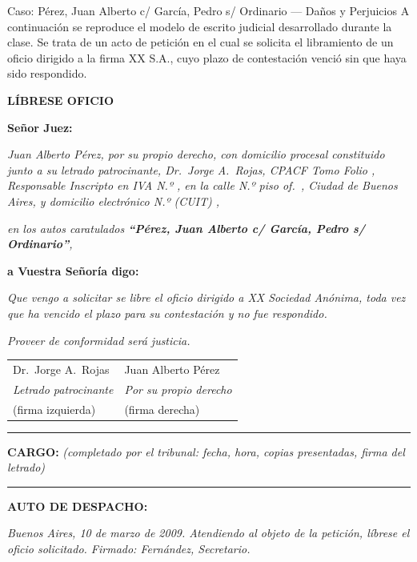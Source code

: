 \documentclass[12pt,oneside]{book}
\begin{document}
\begin{example}{Caso: Pérez, Juan Alberto c/ García, Pedro s/ Ordinario --- Daños y Perjuicios}
A continuación se reproduce el modelo de escrito judicial desarrollado durante la clase. Se trata de un acto de petición en el cual se solicita el libramiento de un oficio dirigido a la firma XX S.A., cuyo plazo de contestación venció sin que haya sido respondido.

\bigskip

\begin{center}
\textbf{LÍBRESE OFICIO}
\end{center}

\medskip

\textbf{Señor Juez:}

\medskip

\textit{Juan Alberto Pérez, por su propio derecho, con domicilio procesal constituido junto a su letrado patrocinante, Dr.\ Jorge A.\ Rojas, CPACF Tomo \underline{\hspace{1cm}} Folio \underline{\hspace{1cm}}, Responsable Inscripto en IVA N.º \underline{\hspace{1.5cm}}, en la calle \underline{\hspace{3cm}} N.º \underline{\hspace{0.8cm}} piso \underline{\hspace{0.5cm}} of.\ \underline{\hspace{0.5cm}}, Ciudad de Buenos Aires, y domicilio electrónico N.º (CUIT) \underline{\hspace{2.5cm}},}

\medskip

\textit{en los autos caratulados \textbf{``Pérez, Juan Alberto c/ García, Pedro s/ Ordinario''},}

\medskip

\textbf{a Vuestra Señoría digo:}

\medskip

\textit{Que vengo a solicitar se libre el oficio dirigido a XX Sociedad Anónima, toda vez que ha vencido el plazo para su contestación y no fue respondido.}

\medskip

\textit{Proveer de conformidad será justicia.}

\medskip

\begin{tabular}{p{}p{}}
Dr.\ Jorge A.\ Rojas & Juan Alberto Pérez \\
\textit{Letrado patrocinante} & \textit{Por su propio derecho} \\
(firma izquierda) & (firma derecha)
\end{tabular}

\medskip
\hrule
\smallskip
\textbf{CARGO:} \textit{(completado por el tribunal: fecha, hora, copias presentadas, firma del letrado)}

\medskip
\hrule
\smallskip
\textbf{AUTO DE DESPACHO:}

\textit{Buenos Aires, 10 de marzo de 2009. Atendiendo al objeto de la petición, líbrese el oficio solicitado. Firmado: Fernández, Secretario.}

\end{example}
\end{document}
